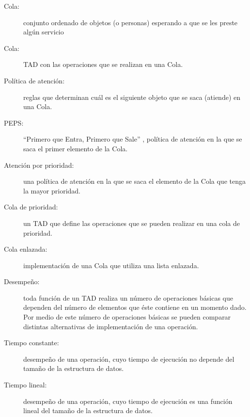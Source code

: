    
   
  
\begin{description}
\item [{Cola:}] conjunto ordenado de objetos (o personas) esperando a que
se les preste algún servicio
\item [{Cola:}] TAD con las operaciones que se realizan en una Cola.
\item [{Política de atención:}] reglas que determinan cuál es el siguiente
objeto que se saca (atiende) en una Cola.
\item [{PEPS:}] ``Primero que Entra, Primero que Sale'' , política de
atención en la que se saca el primer elemento de la Cola.
\item [{Atención por prioridad:}] una política de atención en la que
se saca el elemento de la Cola que tenga la mayor prioridad.
\item [{Cola de prioridad:}] un TAD que define las operaciones que se
pueden realizar en una cola de prioridad.
\item [{Cola enlazada:}] implementación de una Cola que utiliza una lista
enlazada.
\item [{Desempeño:}] toda función de un TAD realiza un número de operaciones
básicas que dependen del número de elementos que éste contiene en
un momento dado. Por medio de este número de operaciones básicas se
pueden comparar distintas alternativas de implementación de una operación.
\item [{Tiempo constante:}] desempeño de una operación, cuyo tiempo de
ejecución no depende del tamaño de la estructura de datos.
\item [{Tiempo lineal:}] desempeño de una operación, cuyo tiempo de ejecución
es una función lineal del tamaño de la estructura de datos.
\end{description}

